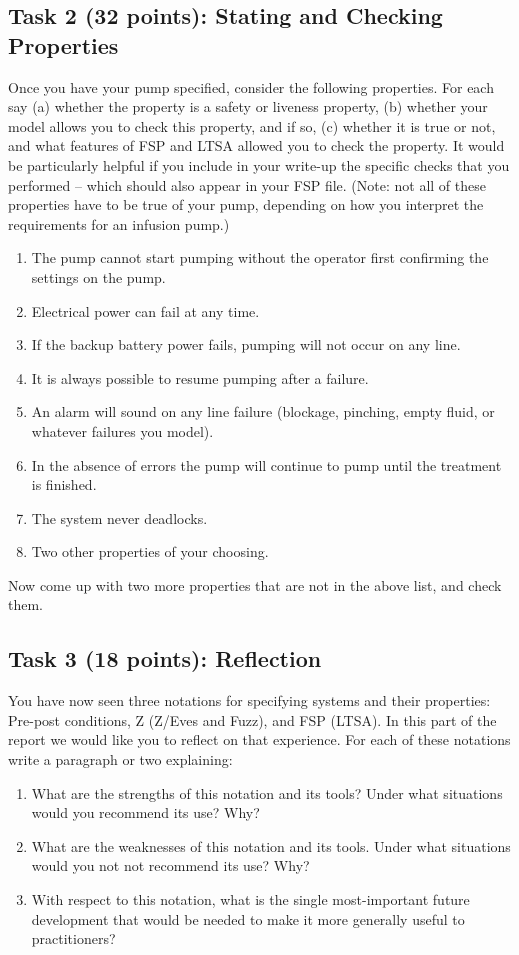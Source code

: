 \documentclass{article}
\newcommand{\head}{\subsection*}
\begin{document}
\head{Task 2 (32 points): Stating and Checking Properties}

Once you have your pump specified, consider the following properties. For each say (a) whether the property
is a safety or liveness property,  (b) whether your model allows you to check this property, and if
so, (c) whether it is true or not, and what features of FSP and LTSA allowed you to check the
property. It would be particularly helpful if you include in your write-up the specific checks that you performed -- which should also appear in your FSP file. (Note: not all of these properties have to be true of your pump, depending on how you interpret the requirements for an infusion pump.)

\begin{enumerate}
    \item The pump cannot start pumping without the operator first confirming the settings on the pump.
    \item Electrical power can fail at any time.
    \item If the backup battery power fails, pumping will not occur on any line.
    \item It is always possible to resume pumping after a failure.
    \item An alarm will sound on any line failure (blockage, pinching, empty fluid, or
whatever failures you model).
    \item In the absence of errors the pump will continue to pump until the
treatment is finished.
    \item The system never deadlocks.
    \item Two other properties of your choosing.
\end{enumerate}

Now come up with two more properties that are not in the above list, and check them.
\head{Task 3 (18 points): Reflection}

 You have now seen three notations for specifying systems and their properties: Pre-post conditions,
 Z (Z/Eves and Fuzz), and FSP (LTSA).  In this part of the report we would like you to reflect on that experience.
 For each of these notations write a paragraph or two explaining:
\begin{enumerate}
 \item What are the strengths of this notation and its tools?  Under what situations would you
recommend its use? Why?
 \item What are the weaknesses of this notation and its tools. Under what
situations would you not not recommend its use? Why?
 \item With respect to this notation, what is
the single most-important future development that would be needed to make it more generally useful
to practitioners?

\end{enumerate}
\end{document}

